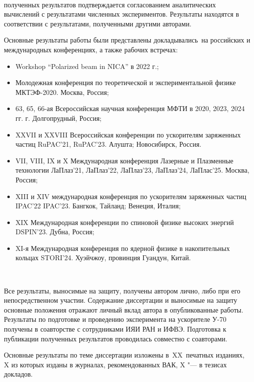 ~\\
\par {\reliability} полученных результатов подтверждается согласованием аналитических вычислений с результатами численных экспериментов. Результаты находятся в соответствии с результатами, полученными другими авторами.
~\\
\par {\probation}
Основные результаты работы были представлены докладывались~на российских и международных конференциях, а также рабочих встречах: 
\begin{itemize}
\item Workshop “Polarized beam in NICA” в 2022 г.;
\item Молодежная конференция по теоретической и экспериментальной физике МКТЭФ-2020. Москва, Россия;
\item 63, 65, 66-ая Всероссийская научная конференция МФТИ в 2020, 2023, 2024 гг. г. Долгопрудный,
Россия;
\item XXVII и XXVIII Всероссийская конференции по ускорителям заряженных частиц RuPAC'21, RuPAC'23. Алушта; Новосибирск, Россия.
\item VII, VIII, IX и X Международная конференция Лазерные и Плазменные технологии ЛаПлаз'21, ЛаПлаз'22, ЛаПлаз'23, ЛаПлаз'24, ЛаПлас'25. Москва, Россия;
\item XIII и XIV международная конференция по ускорителям заряженных частиц IPAC'22 IPAC'23. Бангкок, Тайланд; Венеция, Италия;
\item XIX Международная конференции по спиновой физике высоких энергий DSPIN'23. Дубна, Россия;
\item XI-я Международная конференция по ядерной физике в накопительных кольцах STORI’24. Хуэйчжоу, провинция Гуандун, Китай.
\end{itemize}
~\\
\par {\contribution} Все результаты, выносимые на защиту, получены автором лично, либо при его непосредственном участии. Содержание диссертации и выносимые на защиту основные положения отражают личный вклад автора в опубликованные работы. Результаты по подготовке и проведению эксперимента на ускорителе У-70 получены в соавторстве с сотрудниками ИЯИ РАН и ИФВЭ. Подготовка к публикации полученных результатов проводилась совместно с соавторами.
~\\
\par {}
{%
 {\publications} Основные результаты по теме диссертации изложены
    в~XX~печатных изданиях,
    X из которых изданы в журналах, рекомендованных ВАК,
    X "--- в тезисах докладов.
}%
